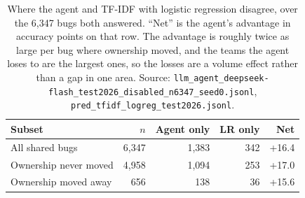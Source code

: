 \begin{table}[t]\centering
\small
\caption{Where the agent and TF-IDF with logistic regression disagree, over the 6{,}347 bugs both answered. ``Net'' is the agent's advantage in accuracy points on that row. The advantage is roughly twice as large per bug where ownership moved, and the teams the agent loses to are the largest ones, so the losses are a volume effect rather than a gap in one area. Source: \texttt{llm\_agent\_deepseek-flash\_test2026\_disabled\_n6347\_seed0.jsonl}, \texttt{pred\_tfidf\_logreg\_test2026.jsonl}.}
\label{tab:headtohead-test2026}
\begin{tabular}{lrrrr}
\toprule
Subset & $n$ & Agent only & LR only & Net \\
\midrule
All shared bugs & 6{,}347 & 1{,}383 & 342 & +16.4 \\
Ownership never moved & 4{,}958 & 1{,}094 & 253 & +17.0 \\
Ownership moved away & 656 & 138 & 36 & +15.6 \\
\bottomrule
\end{tabular}
\end{table}
